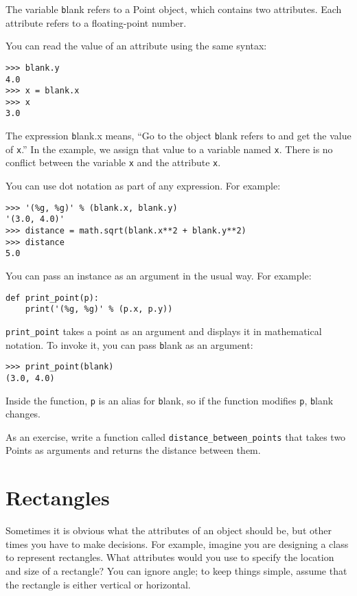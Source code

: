 \documentclass[
DIV=11,
fontsize=13,
twoside,
headinclude=false,
titlepage=firstiscover,
abstract=true,
headsepline=true,
footsepline=true,
chapterprefix=true, %
headings=big,
bibliography=totoc,%
captions=tableheading
]{scrbook}
\theoremstyle{definition}
\begin{document}
The variable {\texttt blank} refers to a Point object, which
contains two attributes.  Each attribute refers to a
floating-point number.

You can read the value of an attribute using the same syntax:

\begin{lstlisting}
>>> blank.y
4.0
>>> x = blank.x
>>> x
3.0
\end{lstlisting}
%
The expression {\texttt blank.x} means, ``Go to the object {\texttt blank}
refers to and get the value of {\texttt x}.''  In the example, we assign that
value to a variable named {\texttt x}.  There is no conflict between
the variable {\texttt x} and the attribute {\texttt x}.

You can use dot notation as part of any expression.  For example:

\begin{lstlisting}
>>> '(%g, %g)' % (blank.x, blank.y)
'(3.0, 4.0)'
>>> distance = math.sqrt(blank.x**2 + blank.y**2)
>>> distance
5.0
\end{lstlisting}
%
You can pass an instance as an argument in the usual way.
For example:

\begin{lstlisting}
def print_point(p):
    print('(%g, %g)' % (p.x, p.y))
\end{lstlisting}
%
\verb"print_point" takes a point as an argument and displays it in
mathematical notation.  To invoke it, you can pass {\texttt blank} as
an argument:

\begin{lstlisting}
>>> print_point(blank)
(3.0, 4.0)
\end{lstlisting}
%
Inside the function, {\texttt p} is an alias for {\texttt blank}, so if
the function modifies {\texttt p}, {\texttt blank} changes.

As an exercise, write a function called \verb"distance_between_points"
that takes two Points as arguments and returns the distance between
them.


\section{Rectangles}
\label{rectangles}

Sometimes it is obvious what the attributes of an object should be,
but other times you have to make decisions.  For example, imagine you
are designing a class to represent rectangles.  What attributes would
you use to specify the location and size of a rectangle?  You can
ignore angle; to keep things simple, assume that the rectangle is
either vertical or horizontal.
\end{document}
